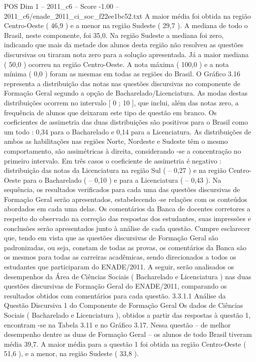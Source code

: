 \begin{textsample}{POS Dim 1 – 2011\_c6 – Score -1.00 – 2011\_c6/enade\_2011\_ci\_soc\_f22ee1bc52.txt}
A maior média foi obtida na região Centro-Oeste ( 46,9 ) e a menor na região Sudeste ( 29,7 ).
A mediana de todo o Brasil, neste componente, foi 35,0.
Na região Sudeste a mediana foi zero, indicando que mais da metade dos alunos desta região não resolveu as questões discursivas ou tiraram nota zero para a solução apresentada.
Já a maior mediana ( 50,0 ) ocorreu na região Centro-Oeste.
A nota máxima ( 100,0 ) e a nota mínima ( 0,0 ) foram as mesmas em todas as regiões do Brasil.
O Gráfico 3.16 representa a distribuição das notas nas questões discursivas no componente de Formação Geral segundo a opção de Bacharelado/Licenciatura.
As modas destas distribuições ocorrem no intervalo [ 0 ; 10 ], que inclui, além das notas zero, a frequência de alunos que deixaram este tipo de questão em branco.
Os coeficientes de assimetria das duas distribuições são positivos para o Brasil como um todo : 0,34 para o Bacharelado e 0,14 para a Licenciatura.
As distribuições de ambos as habilitações nas regiões Norte, Nordeste e Sudeste têm o mesmo comportamento, são assimétricas à direita, considerando -se a concentração no primeiro intervalo.
Em três casos o coeficiente de assimetria é negativo : distribuição das notas da Licenciatura na região Sul ( – 0,27 ) e na região Centro-Oeste para o Bacharelado ( – 0,10 ) e para a Licenciatura ( – 0,43 ).
Na sequência, os resultados verificados para cada uma das questões discursivas de Formação Geral serão apresentados, estabelecendo -se relações com os conteúdos abordados em cada uma delas.
Os comentários da Banca de docentes corretores a respeito do observado na correção das respostas dos estudantes, suas impressões e conclusões serão apresentados junto à análise de cada questão.
Cumpre esclarecer que, tendo em vista que as questões discursivas de Formação Geral são padronizadas, ou seja, constam de todas as provas, os comentários da Banca são os mesmos para todas as carreiras acadêmicas, sendo direcionados a todos os estudantes que participaram do ENADE/2011.
A seguir, serão analisados os desempenhos da Área de Ciências Sociais ( Bacharelado e Licenciatura ) nas duas questões discursivas de Formação Geral do ENADE/2011, comparando os resultados obtidos com comentários para cada questão. 3.3.1.1 Análise da Questão Discursiva 1 do Componente de Formação Geral Os dados de Ciências Sociais ( Bacharelado e Licenciatura ), obtidos a partir das respostas à questão 1, encontram -se na Tabela 3.11 e no Gráfico 3.17.
Nessa questão – de melhor desempenho dentre as duas de Formação Geral – os alunos de todo Brasil tiveram média 39,7.
A maior média para a questão 1 foi obtida na região Centro-Oeste ( 51,6 ), e a menor, na região Sudeste ( 33,8 ).

\end{textsample}
